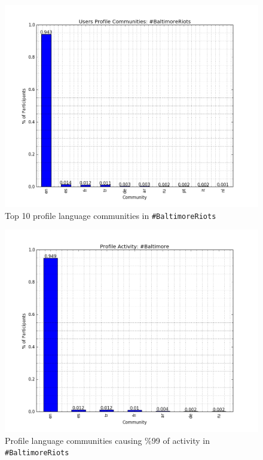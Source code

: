 \documentclass{llncs}
\begin{document}
\begin{figure}[htb]
\centering
\includegraphics[width=\columnwidth]{images/baltimore_profile_size.png}
\caption{Top 10 profile language communities in {\texttt{\#BaltimoreRiots}}}
\label{fig:baltimore_profile_size}
\end{figure}

\begin{figure}[htb]
\centering
\includegraphics[width=\columnwidth]{images/baltimore_profile_activity.png}
\caption{Profile language communities causing \%99 of activity in {\texttt{\#BaltimoreRiots}}}
\label{fig:baltimore_profile_activity}
\end{figure}
\end{document}
